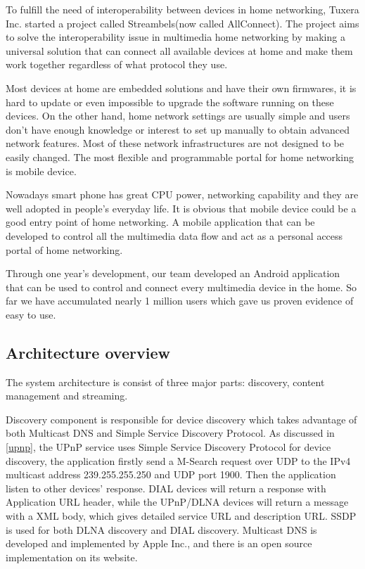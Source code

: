 
To fulfill the need of interoperability between devices in home networking,
Tuxera Inc. started a project called Streambels(now called AllConnect). The
project aims to solve the interoperability issue in multimedia home networking
by making a universal solution that can connect all available devices at home
and make them work together regardless of what protocol they use.

Most devices at home are embedded solutions and have their own firmwares, it is
hard to update or even impossible to upgrade the software running on these
devices. On the other hand, home network settings are usually simple and users
don't have enough knowledge or interest to set up manually to obtain advanced
network features. Most of  these network infrastructures are not designed to be
easily changed. The most flexible and programmable portal for home networking
is mobile device. 

Nowadays smart phone has great CPU power, networking capability and they
are well adopted in people's everyday life. It is obvious that mobile device
could be a good entry point of home networking. A mobile application that can be
developed to control all the multimedia data flow and act as a personal access
portal of home networking.

Through one year's development, our team developed an Android application that
can be used to control and connect every multimedia device in the home. So far
we have accumulated nearly 1 million users which gave us proven evidence of easy
to use.

\subsection{Architecture overview}
The system architecture is consist of three major parts: discovery, content
management and streaming.

Discovery component is responsible for device discovery which takes advantage of
both Multicast DNS and Simple Service Discovery Protocol. As discussed in
\ref{upnp}, the UPnP service uses Simple Service Discovery Protocol for device
discovery, the application firstly send a M-Search request over UDP to the
IPv4 multicast address 239.255.255.250 and UDP port 1900. Then the application
listen to other devices' response. DIAL devices will return a response with
Application URL header, while the UPnP/DLNA devices will return a message with
a XML body, which gives detailed service URL and description URL. SSDP is used
for both DLNA discovery and DIAL discovery. Multicast DNS is developed and
implemented by Apple Inc., and there is an open source implementation on its
website.

